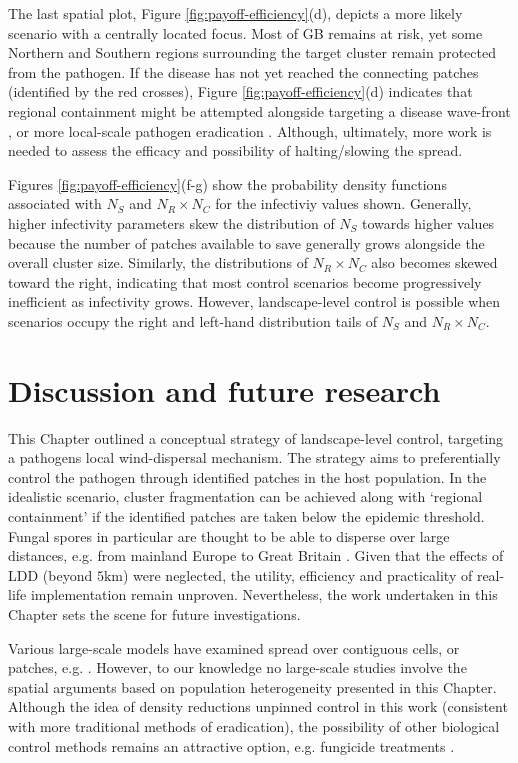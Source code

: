 The last spatial plot, Figure \ref{fig:payoff-efficiency}(d), depicts a more likely scenario with a centrally located focus.
Most of GB remains at risk, yet some Northern and Southern regions surrounding the target cluster remain protected from the pathogen.
If the disease has not yet reached the connecting patches (identified by the red crosses), Figure \ref{fig:payoff-efficiency}(d) indicates that regional containment might be attempted alongside targeting a disease wave-front \cite{large-scale-control}, or more local-scale pathogen eradication \cite{WEBIDEMICS}. 
Although, ultimately, more work is needed to assess the efficacy and possibility of halting/slowing the spread.

Figures \ref{fig:payoff-efficiency}(f-g) show the probability density functions associated with $N_S$ and $N_R \times N_C$ for the infectiviy values shown.
Generally, higher infectivity parameters skew the distribution of $N_S$ towards higher values because the number of patches available to save generally grows alongside the overall cluster size.
Similarly, the distributions of $N_R \times N_C$ also becomes skewed toward the right, indicating that most control scenarios become progressively inefficient as infectivity grows.
However, landscape-level control is possible when scenarios occupy the right and left-hand distribution tails of $N_S$ and $N_R \times N_C$.

\section{Discussion and future research}

This Chapter outlined a conceptual strategy of landscape-level control, targeting a pathogens local wind-dispersal mechanism.
The strategy aims to preferentially control the pathogen through identified patches in the host population. 
In the idealistic scenario, cluster fragmentation can be achieved along with `regional containment' if the identified patches are taken below the epidemic threshold.
Fungal spores in particular are thought to be able to disperse over large distances, e.g. from mainland Europe to Great Britain \cite{wylder2018evidence, freer2017tree}.
Given that the effects of LDD (beyond $5\mathrm{km}$) were neglected, the utility, efficiency and practicality of real-life implementation remain unproven. Nevertheless, the work undertaken in this Chapter sets the scene for future investigations.

Various large-scale models have examined spread over contiguous cells, or patches, e.g. \cite{gaydos2019forecasting, large-scale-control, meentemeyer2011epidemiological}.
However, to our knowledge no large-scale studies involve the spatial arguments based on population heterogeneity presented in this Chapter.
Although the idea of density reductions unpinned control in this work (consistent with more traditional methods of eradication),
the possibility of other biological control methods remains an attractive option, e.g. fungicide treatments \cite{hauptman2015application}.


